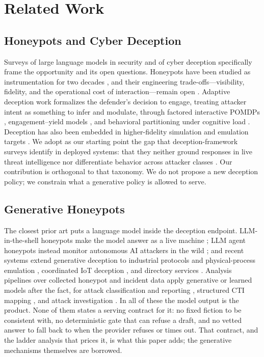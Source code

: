 \section{Related Work}
\label{sec:related}

\subsection{Honeypots and Cyber Deception}

Surveys of large language models in security \cite{wang2024} and of cyber
deception specifically \cite{lopez2024} frame the opportunity and its open
questions. Honeypots have been studied as instrumentation for two decades
\cite{spitzner2002}, and their engineering trade-offs---visibility,
fidelity, and the operational cost of interaction---remain open
\cite{sokol2017}. Adaptive deception work formalizes the
defender's decision to engage, treating attacker intent as something to
infer and modulate, through factored interactive POMDPs
\cite{shinde2020}, engagement--yield models
\cite{bera2024}, and behavioral partitioning under cognitive load
\cite{liska2024}. Deception has also been embedded in higher-fidelity
simulation and emulation targets \cite{kouremetis2024}. We adopt as our
starting point the gap that deception-framework surveys identify in deployed
systems: that they neither ground responses in live threat intelligence
nor differentiate behavior across attacker classes \cite{lopez2024}. Our
contribution is orthogonal to that taxonomy. We do not propose a new
deception policy; we constrain what a generative policy is allowed to serve.

\subsection{Generative Honeypots}

The closest prior art puts a language model inside the deception endpoint.
LLM-in-the-shell honeypots make the model answer as a live machine
\cite{valeros2024}; LLM agent honeypots instead monitor autonomous AI
attackers in the wild \cite{reworr2024}; and recent systems extend
generative deception to industrial protocols and physical-process emulation
\cite{vasilatos2025llmpot}, coordinated IoT deception
\cite{guan2025cpds}, and directory services
\cite{jimenez2025}. Analysis pipelines over collected honeypot and
incident data apply generative or learned models after the fact, for attack
classification and reporting \cite{lanka2024,simoni2024,blefari2025},
structured CTI mapping \cite{orbinato2022}, and attack investigation
\cite{alsaheel2021}. In all of these the model
output is the product. None of them states a serving contract for it: no
fixed fiction to be consistent with, no deterministic gate that can refuse
a draft, and no vetted answer to fall back to when the provider refuses or
times out. That contract, and the ladder analysis that prices it, is what
this paper adds; the generative mechanisms themselves are borrowed.

